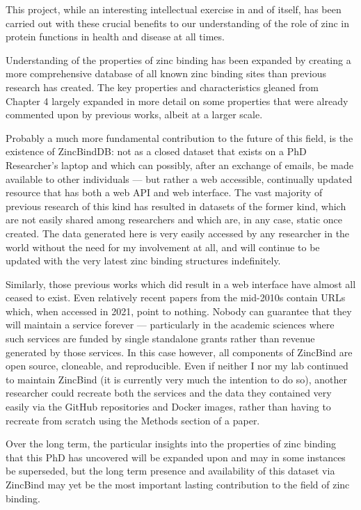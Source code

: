 This project, while an interesting intellectual exercise in and of itself, has been carried out with these crucial benefits to our understanding of the role of zinc in protein functions in health and disease at all times.

Understanding of the properties of zinc binding has been expanded by creating a more comprehensive database of all known zinc binding sites than previous research has created. The key properties and characteristics gleaned from Chapter 4 largely expanded in more detail on some properties that were already commented upon by previous works, albeit at a larger scale.

Probably a much more fundamental contribution to the future of this field, is the existence of ZincBindDB: not as a closed dataset that exists on a PhD Researcher's laptop and which can possibly, after an exchange of emails, be made available to other individuals ---  but rather a web accessible, continually updated resource that has both a web API and web interface. The vast majority of previous research of this kind has resulted in datasets of the former kind, which are not easily shared among researchers and which are, in any case, static once created. The data generated here is very easily accessed by any researcher in the world without the need for my involvement at all, and will continue to be updated with the very latest zinc binding structures indefinitely.

Similarly, those previous works which did result in a web interface have almost all ceased to exist. Even relatively recent papers from the mid-2010s contain URLs which, when accessed in 2021, point to nothing. Nobody can guarantee that they will maintain a service forever --- particularly in the academic sciences where such services are funded by single standalone grants rather than revenue generated by those services. In this case however, all components of ZincBind are open source, cloneable, and reproducible. Even if neither I nor my lab continued to maintain ZincBind (it is currently very much the intention to do so), another researcher could recreate both the services and the data they contained very easily via the GitHub repositories and Docker images, rather than having to recreate from scratch using the Methods section of a paper.

Over the long term, the particular insights into the properties of zinc binding that this PhD has uncovered will be expanded upon and may in some instances be superseded, but the long term presence and availability of this dataset via ZincBind may yet be the most important lasting contribution to the field of zinc binding.


